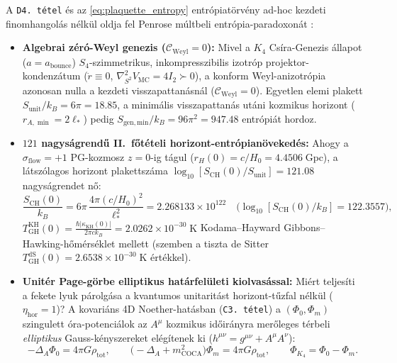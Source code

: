 \documentclass[11pt,a4paper]{article}
\theoremstyle{remark}
\begin{document}
A \texttt{D4.\ t\'etel} \'es az \eqref{eq:plaquette_entropy} entr\'opiat\"orv\'eny ad-hoc kezdeti finomhangol\'as n\'elk\"ul oldja fel Penrose m\'ultbeli entr\'opia-paradoxon\'at \cite{Penrose1979Weyl}:
\begin{itemize}
  \item \textbf{Algebrai z\'er\'o-Weyl genezis ($\mathcal{C}_{\mathrm{Weyl}} = 0$):} Mivel a $K_4$ Cs\'ira-Genezis \'allapot ($a = a_{\mathrm{bounce}}$) $S_4$-szimmetrikus, inkompresszibilis izotr\'op projektor-kondenz\'atum ($\dot{r} \equiv 0$, $\nabla^2_{S^2} V_{\mathrm{MC}} = 4I_2 \succ 0$), a konform Weyl-anizotr\'opia azonosan nulla a kezdeti visszapattan\'asn\'al ($\mathcal{C}_{\mathrm{Weyl}} = 0$). Egyetlen elemi plakett $S_{\mathrm{unit}}/k_B = 6\pi = 18.85$, a minim\'alis visszapattan\'as ut\'ani kozmikus horizont ($r_{A,\min} = 2\ell_*$) pedig $S_{\mathrm{gen,min}}/k_B = 96\pi^2 = 947.48$ entr\'opi\'at hordoz.
  \item \textbf{$121$ nagys\'agrend\H{u} II.\ f\H{o}t\'eteli horizont-entr\'opian\"oveked\'es:} Ahogy a $\sigma_{\mathrm{flow}} = +1$ PG-kozmosz $z = 0$-ig t\'agul ($r_H(0) = c/H_0 = 4.4506\;\mathrm{Gpc}$), a l\'atsz\'olagos horizont plakettsz\'ama $\log_{10}[S_{\mathrm{CH}}(0)/S_{\mathrm{unit}}] = 121.08$ nagys\'agrendet n\H{o}:
  \begin{equation}
    \frac{S_{\mathrm{CH}}(0)}{k_B} = 6\pi\,\frac{4\pi(c/H_0)^2}{\ell_*^2} = 2.268133 \times 10^{122} \quad \bigl(\log_{10}[S_{\mathrm{CH}}(0)/k_B] = 122.3557\bigr),
    \label{eq:s_ch_z0}
  \end{equation}
  $T_{\mathrm{GH}}^{\mathrm{KH}}(0) = \frac{\hbar|\kappa_{\mathrm{KH}}(0)|}{2\pi c k_B} = 2.0262 \times 10^{-30}\;\mathrm{K}$ Kodama--Hayward Gibbons--Hawking-h\H{o}m\'ers\'eklet mellett (szemben a tiszta de Sitter $T_{\mathrm{GH}}^{\mathrm{dS}}(0) = 2.6538 \times 10^{-30}\;\mathrm{K}$ \'ert\'ekkel).
  \item \textbf{Unit\'er Page-g\"orbe elliptikus hat\'arfel\"uleti kiolvas\'assal:} Mi\'ert teljes\'iti a fekete lyuk p\'arolg\'asa a kvantumos unitarit\'ast \cite{Page1993} horizont-t\H{u}zfal n\'elk\"ul ($\eta_{\mathrm{hor}} = 1$)? A kovari\'ans 4D Noether-hat\'asban (\texttt{C3.\ t\'etel}) \cite{JolcsakTauFoundationSeries2026} a $(\Phi_0, \Phi_m)$ szingulett \'ora-potenci\'alok az $A^\mu$ kozmikus id\H{o}ir\'anyra mer\H{o}leges t\'erbeli \emph{elliptikus} Gauss-k\'enyszereket el\'eg\'itenek ki ($h^{\mu\nu} = g^{\mu\nu} + A^\mu A^\nu$):
  \begin{equation}
    -\Delta_A \Phi_0 = 4\pi G\rho_{\mathrm{tot}}, \qquad \bigl(-\Delta_A + m_{\mathrm{COCA}}^2\bigr)\Phi_m = 4\pi G\rho_{\mathrm{tot}}, \qquad \Phi_{K_4} = \Phi_0 - \Phi_m.

\end{equation}
\end{itemize}
\end{document}
